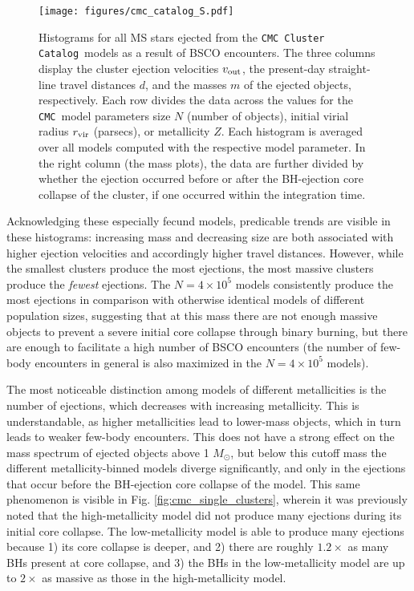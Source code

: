 \documentclass[twocolumn]{aastex631}
\newcommand{\CMC}{\texttt{CMC}}
\newcommand{\CMCcat}{\texttt{CMC Cluster Catalog}}
\begin{document}
\begin{figure*}
    \centering
    \texttt{[image: figures/cmc\_catalog\_S.pdf]}
    \caption{
        Histograms for all MS stars ejected from the \CMCcat\ models as a result of BSCO encounters.
        The three columns display the cluster ejection velocities $v_{\rm out}$, the present-day straight-line travel distances $d$, and the masses $m$ of the ejected objects, respectively.
        Each row divides the data across the values for the \CMC\ model parameters size $N$ (number of objects), initial virial radius $r_{\rm vir}$ (parsecs), or metallicity $Z$.
        Each histogram is averaged over all models computed with the respective model parameter.
        In the right column (the mass plots), the data are further divided by whether the ejection occurred before or after the BH-ejection core collapse of the cluster, if one occurred within the integration time.
    }
    \label{fig:cmc_catalog}
\end{figure*}

Acknowledging these especially fecund models, predicable trends are visible in these histograms: increasing mass and decreasing size are both associated with higher ejection velocities and accordingly higher travel distances.
However, while the smallest clusters produce the most ejections, the most massive clusters produce the \textit{fewest} ejections.
The $N = 4 \times 10^5$ models consistently produce the most ejections in comparison with otherwise identical models of different population sizes, suggesting that at this mass there are not enough massive objects to prevent a severe initial core collapse through binary burning, but there are enough to facilitate a high number of BSCO encounters (the number of few-body encounters in general is also maximized in the $N = 4 \times 10^5$ models).

The most noticeable distinction among models of different metallicities is the number of ejections, which decreases with increasing metallicity.
This is understandable, as higher metallicities lead to lower-mass objects, which in turn leads to weaker few-body encounters.
This does not have a strong effect on the mass spectrum of ejected objects above 1 $M_\odot$, but below this cutoff mass the different metallicity-binned models diverge significantly, and only in the ejections that occur before the BH-ejection core collapse of the model.
This same phenomenon is visible in Fig. \ref{fig:cmc_single_clusters}, wherein it was previously noted that the high-metallicity model did not produce many ejections during its initial core collapse.
The low-metallicity model is able to produce many ejections because 1) its core collapse is deeper, and 2) there are roughly $1.2 \times$ as many BHs present at core collapse, and 3) the BHs in the low-metallicity model are up to $2 \times$ as massive as those in the high-metallicity model.
\end{document}
